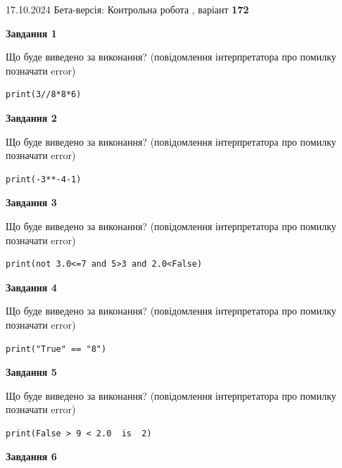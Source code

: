 \documentclass[12pt, ukrainian]{article}
\begin{document}
{\Large{17.10.2024 Бета-версія: Контрольна робота , варіант  \No \textbf { 172 }\par}}
{
\begin {large}
{\begin {center}\textbf{Завдання 1}\end {center}}

Що буде виведено за виконання? (повідомлення інтерпретатора про помилку позначати error)\par
\begin{verbatim}
print(3//8*8*6)
\end{verbatim}

{\begin {center}\textbf{Завдання 2}\end {center}}

Що буде виведено за виконання? (повідомлення інтерпретатора про помилку позначати error)\par
\begin{verbatim}
print(-3**-4-1)
\end{verbatim}

{\begin {center}\textbf{Завдання 3}\end {center}}

Що буде виведено за виконання? (повідомлення інтерпретатора про помилку позначати error)\par
\begin{verbatim}
print(not 3.0<=7 and 5>3 and 2.0<False)
\end{verbatim}

{\begin {center}\textbf{Завдання 4}\end {center}}

Що буде виведено за виконання? (повідомлення інтерпретатора про помилку позначати error)\par
\begin{verbatim}
print("True" == "8")
\end{verbatim}

{\begin {center}\textbf{Завдання 5}\end {center}}

Що буде виведено за виконання? (повідомлення інтерпретатора про помилку позначати error)\par
\begin{verbatim}
print(False > 9 < 2.0  is  2)
\end{verbatim}

{\begin {center}\textbf{Завдання 6}\end {center}}


\end{large}}
\end{document}
